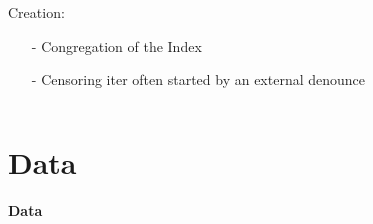 \documentclass[aspectratio=169,red,12pt]{beamer}
\begin{document}
\begin{frame}
\begin{columns}
\begin{column}[t]{0.77\textwidth}
\begin{itemize}
    \end{itemize}

    Creation:\vspace{0.05cm}    
 \begin{itemize}
 	\item[-] Congregation of the Index
 	\item[-] Censoring iter often started by an external denounce
 \end{itemize}

\end{column}

\end{columns}


\end{frame}


\section{Data}
 \begin{frame}{}
	\centering \Huge
	{\color{structure}\textbf{Data}}
\end{frame}
\end{document}
